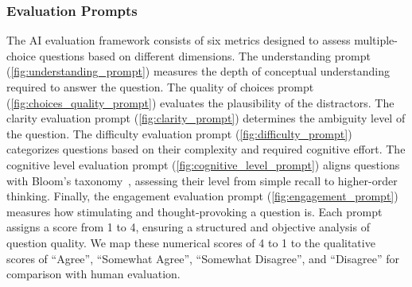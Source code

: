 \subsubsection{Evaluation Prompts}
\label{subsubsec:eval-prompts}
The AI evaluation framework consists of six metrics designed to assess multiple-choice questions based on different dimensions. The understanding prompt (\autoref{fig:understanding_prompt}) measures the depth of conceptual understanding required to answer the question. The quality of choices prompt (\autoref{fig:choices_quality_prompt}) evaluates the plausibility of the distractors. The clarity evaluation prompt (\autoref{fig:clarity_prompt}) determines the ambiguity level of the question. The difficulty evaluation prompt (\autoref{fig:difficulty_prompt}) categorizes questions based on their complexity and required cognitive effort. The cognitive level evaluation prompt (\autoref{fig:cognitive_level_prompt}) aligns questions with Bloom's taxonomy~\cite{anderson2001taxonomy}, assessing their level from simple recall to higher-order thinking. Finally, the engagement evaluation prompt (\autoref{fig:engagement_prompt}) measures how stimulating and thought-provoking a question is. Each prompt assigns a score from 1 to 4, ensuring a structured and objective analysis of question quality. We map these numerical scores of 4 to 1 to the qualitative scores of ``Agree'', ``Somewhat Agree'', ``Somewhat Disagree'', and ``Disagree'' for comparison with human evaluation.


